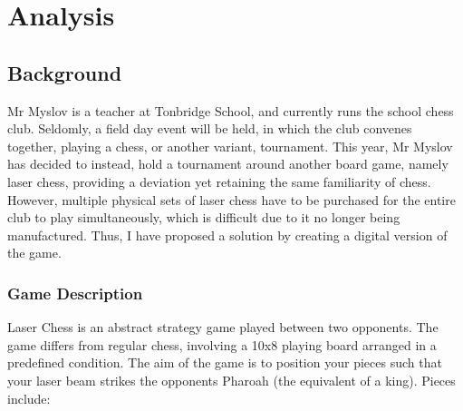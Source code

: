 \documentclass[../main/main.tex]{subfiles}
\begin{document}
\newpage

\chapter{Analysis}
\section{Background}
Mr Myslov is a teacher at Tonbridge School, and currently runs the school chess club. Seldomly, a field day event will be held, in which the club convenes together, playing a chess, or another variant, tournament. This year, Mr Myslov has decided to instead, hold a tournament around another board game, namely laser chess, providing a deviation yet retaining the same familiarity of chess. However, multiple physical sets of laser chess have to be purchased for the entire club to play simultaneously, which is difficult due to it no longer being manufactured. Thus, I have proposed a solution by creating a digital version of the game.

\subsection{Game Description}
Laser Chess is an abstract strategy game played between two opponents. The game differs from regular chess, involving a 10x8 playing board arranged in a predefined condition. The aim of the game is to position your pieces such that your laser beam strikes the opponents Pharoah (the equivalent of a king). Pieces include:
\end{document}
